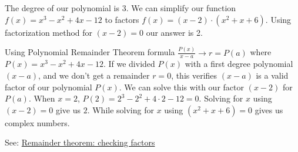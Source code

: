 \documentclass{article}
\begin{document}
The degree of our polynomial is $3$. We can simplify our function $f(x) = x^{3}-x^{2}+4x-12$ to factors $f(x)= (x-2)\cdot (x^{2}+x+6)$. Using factorization method for $(x-2)=0$ our answer is 2.

Using Polynomial Remainder Theorem formula $\frac{P(x)}{x-a}\xrightarrow{} r=P(a)$ where $P(x) = x^{3}-x^{2}+4x-12$. If we divided $P(x)$ with a first degree polynomial $(x-a)$, and we don't get a remainder $r=0$, this verifies $(x-a)$ is a valid factor of our polynomial $P(x)$. We can solve this with our factor $(x-2)$ for $P(a)$. When $x=2$, $P(2)=2^{3}-2^{2}+4\cdot2-12=0$. Solving for $x$ using $(x-2)=0$ give us $2$. While solving for $x$ using $(x^{2}+x+6)=0$ gives us complex numbers.

See: \href{https://www.khanacademy.org/math/algebra2/x2ec2f6f830c9fb89:poly-div/x2ec2f6f830c9fb89:remainder-theorem/v/polynomial-remainder-theorem-to-test-factor}{Remainder theorem: checking factors}
\end{document}
